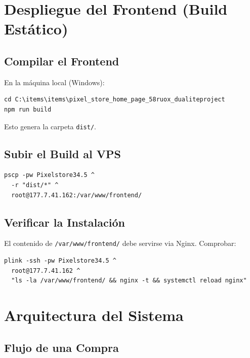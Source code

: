 \documentclass[12pt,a4paper]{article}
\begin{document}
\section{Despliegue del Frontend (Build Estático)}

\subsection{Compilar el Frontend}

En la máquina local (Windows):

\begin{lstlisting}
cd C:\items\items\pixel_store_home_page_58ruox_dualiteproject
npm run build
\end{lstlisting}

Esto genera la carpeta \texttt{dist/}.

\subsection{Subir el Build al VPS}

\begin{lstlisting}
pscp -pw Pixelstore34.5 ^
  -r "dist/*" ^
  root@177.7.41.162:/var/www/frontend/
\end{lstlisting}

\subsection{Verificar la Instalación}

El contenido de \texttt{/var/www/frontend/} debe servirse via Nginx. Comprobar:

\begin{lstlisting}
plink -ssh -pw Pixelstore34.5 ^
  root@177.7.41.162 ^
  "ls -la /var/www/frontend/ && nginx -t && systemctl reload nginx"
\end{lstlisting}

\newpage

\section{Arquitectura del Sistema}

\subsection{Flujo de una Compra}
\end{document}
